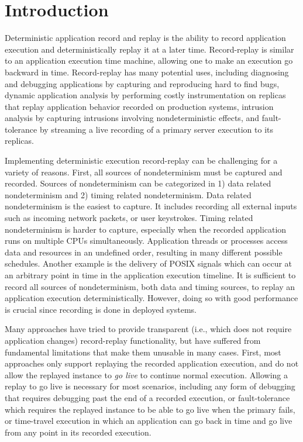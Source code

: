 \chapter{Introduction}
\label{ch:intro}

Deterministic application record and replay is the ability to record application
execution and deterministically replay it at a later time. 
Record-replay is similar to an application execution time machine, allowing
one to make an execution go backward in time. Record-replay has
many potential uses, including diagnosing and debugging applications by
capturing and reproducing hard to find bugs, dynamic application analysis by
performing costly instrumentation on replicas that replay application behavior
recorded on production systems, intrusion analysis by capturing intrusions
involving nondeterministic effects, and fault-tolerance by streaming
a live recording of a primary server execution to its replicas.

Implementing deterministic execution record-replay can be challenging for a
variety of reasons. First, all sources of nondeterminism must be captured and recorded.
Sources of nondeterminism can be categorized in 1) data related nondeterminism
and 2) timing related nondeterminism. Data related nondeterminism is the easiest
to capture. It includes recording all external inputs such as incoming network
packets, or user keystrokes. Timing related nondeterminism is harder to capture,
especially when the recorded application runs on multiple CPUs simultaneously.
Application threads or processes access data and resources in an undefined
order, resulting in many different possible schedules. Another example is the
delivery of POSIX signals which can occur at an arbitrary point in time in the
application execution timeline. It is sufficient to record all sources of
nondeterminism, both data and timing sources, to replay an application
execution deterministically. However, doing so with good performance is crucial
since recording is done in deployed systems.

Many approaches have tried to provide transparent (i.e., which does not require
application changes) record-replay functionality, but have suffered from
fundamental limitations that make them unusable in many cases.  First, most
approaches only support replaying the recorded application execution, and do not
allow the replayed instance to {\em go live} to continue normal execution.
Allowing a replay to go live is necessary for most scenarios, including
any form of debugging that requires debugging past the end of a recorded execution,
or fault-tolerance which requires the replayed instance to be able to go live
when the primary fails, or time-travel execution in which an application can go
back in time and go live from any point in its recorded execution.

